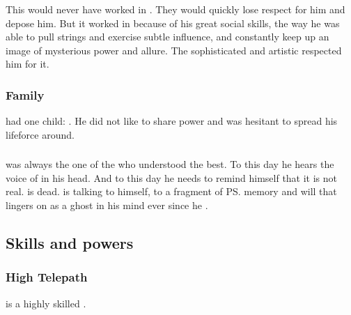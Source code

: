 This  would never have worked in \Mystraacht. 
They would quickly lose respect for him and depose him. 
But it worked in \CiriathSepher{} because of his great social skills, the way he was able to pull strings and exercise subtle influence, and constantly keep up an image of mysterious power and allure. 
The sophisticated and artistic \CiriathSepher{} respected him for it. 





\subsubsection{Family}
\Azraid{} had one child: . 
He did not like to share power and was hesitant to spread his lifeforce around. 







\subsubsection{\Nexagglachel}
\Azraid{} was always the one of the \satharioth{} who understood  the best. 
To this day he hears the voice of \Nexagglachel{} in his head. 
And to this day he needs to remind himself that it is not real. 
\Nexagglachel{} is dead. 
\Azraid{} is talking to himself, to a fragment of \ps{\Nexagglachel}{} memory and will that lingers on as a ghost in his mind ever since he . 









\subsection{Skills and powers}





\subsubsection{High Telepath}
\Azraid{} is a highly skilled . 















